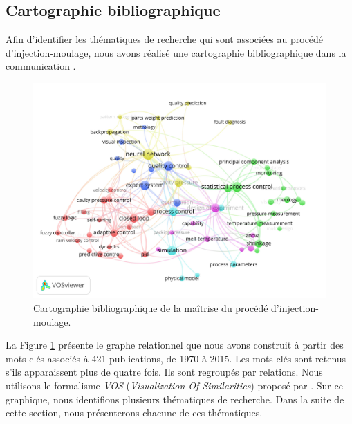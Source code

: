 \subsection{Cartographie bibliographique} \label{subsec:injection_research}
Afin d'identifier les thématiques de recherche qui sont associées au procédé d'injection-moulage, nous avons réalisé une cartographie bibliographique dans la communication  \cite{nagorny_injection_2017}.

\begin{figure}[bhtp]
	\centering
	\includegraphics[width=\textwidth,height=\textheight,keepaspectratio]{../Chap1/Figures/tagMapFinalPubliOccurence.jpg}
	\caption{Cartographie bibliographique de la maîtrise du procédé d'injection-moulage.}
	\label{fig:cartographie}
\end{figure}

La Figure \ref{fig:cartographie} présente le graphe relationnel que nous avons construit à partir des mots-clés associés à 421 publications, de 1970 à 2015.
Les mots-clés sont retenus s’ils apparaissent plus de quatre fois.
Ils sont regroupés par relations.
Nous utilisons le formalisme \textit{VOS} (\textit{Visualization Of Similarities}) proposé par \citeauthor{vaneck_vos_2006} \cite{vaneck_vos_2006, van_eck_comparison_2010}.
Sur ce graphique, nous identifions plusieurs thématiques de recherche.
Dans la suite de cette section, nous présenterons chacune de ces thématiques.

